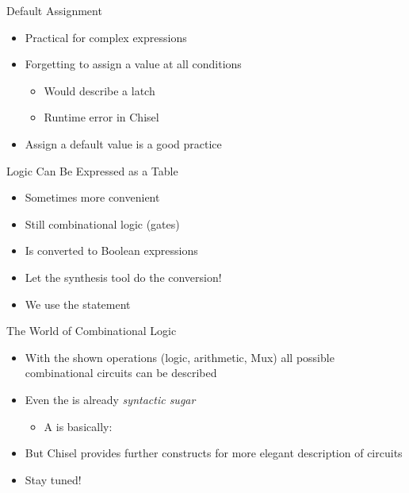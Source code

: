\begin{frame}[fragile]{Default Assignment}
\begin{itemize}
\item Practical for complex expressions
\item Forgetting to assign a value at all conditions
\begin{itemize}
\item Would describe a latch
\item Runtime error in Chisel
\end{itemize}
\item Assign a default value is a good practice
\end{itemize}
\end{frame}

\begin{frame}[fragile]{Logic Can Be Expressed as a Table}
\begin{itemize}
\item Sometimes more convenient 
\item Still combinational logic (gates)
\item Is converted to Boolean expressions
\item Let the synthesis tool do the conversion!
\item We use the  statement
\end{itemize}
\end{frame}



\begin{frame}[fragile]{The World of Combinational Logic}
\begin{itemize}
\item With the shown operations (logic, arithmetic, Mux) all possible combinational circuits can be described
\item Even the  is already \emph{syntactic sugar}
\begin{itemize}
\item A  is basically: 
\end{itemize}
\item But Chisel provides further constructs for more elegant description of circuits
\item Stay tuned!
\end{itemize}
\end{frame}


